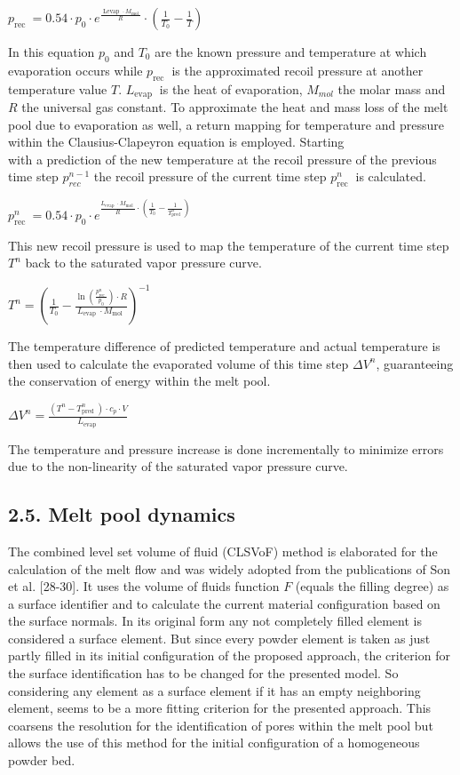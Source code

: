 \documentclass[10pt]{article}
\begin{document}
$p_{\text {rec }}=0.54 \cdot p_{0} \cdot e^{\frac{\text { Levap } \cdot M_{\text {mol }}}{R}} \cdot\left(\frac{1}{T_{0}}-\frac{1}{T}\right)$

In this equation $p_{0}$ and $T_{0}$ are the known pressure and temperature at which evaporation occurs while $p_{\text {rec }}$ is the approximated recoil pressure at another temperature value $T$. $L_{\text {evap }}$ is the heat of evaporation, $M_{m o l}$ the molar mass and $R$ the universal gas constant. To approximate the heat and mass loss of the melt pool due to evaporation as well, a return mapping for temperature and pressure within the Clausius-Clapeyron equation is employed. Starting\\
with a prediction of the new temperature at the recoil pressure of the previous time step $p_{r e c}^{n-1}$ the recoil pressure of the current time step $p_{\text {rec }}^{n}$ is calculated.

$p_{\text {rec }}^{n}=0.54 \cdot p_{0} \cdot e^{\frac{L_{\text {evap }} \cdot M_{\text {mol }}}{R} \cdot\left(\frac{1}{T_{0}}-\frac{1}{T_{\text {pred }}^{n}}\right)}$

This new recoil pressure is used to map the temperature of the current time step $T^{n}$ back to the saturated vapor pressure curve.

$T^{n}=\left(\frac{1}{T_{0}}-\frac{\ln \left(\frac{p_{\text {rec }}^{n}}{p_{0}}\right) \cdot R}{L_{\text {evap }} \cdot M_{\text {mol }}}\right)^{-1}$

The temperature difference of predicted temperature and actual temperature is then used to calculate the evaporated volume of this time step $\Delta V^{n}$, guaranteeing the conservation of energy within the melt pool.

$\Delta V^{n}=\frac{\left(T^{n}-T_{\text {pred }}^{n}\right) \cdot c_{p} \cdot V}{L_{\text {evap }}}$

The temperature and pressure increase is done incrementally to minimize errors due to the non-linearity of the saturated vapor pressure curve.

\subsection*{2.5. Melt pool dynamics}
The combined level set volume of fluid (CLSVoF) method is elaborated for the calculation of the melt flow and was widely adopted from the publications of Son et al. [28-30]. It uses the volume of fluids function $F$ (equals the filling degree) as a surface identifier and to calculate the current material configuration based on the surface normals. In its original form any not completely filled element is considered a surface element. But since every powder element is taken as just partly filled in its initial configuration of the proposed approach, the criterion for the surface identification has to be changed for the presented model. So considering any element as a surface element if it has an empty neighboring element, seems to be a more fitting criterion for the presented approach. This coarsens the resolution for the identification of pores within the melt pool but allows the use of this method for the initial configuration of a homogeneous powder bed.
\end{document}
